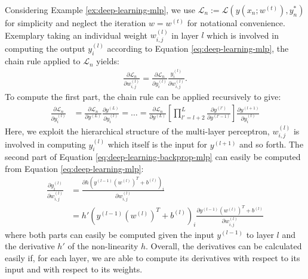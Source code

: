 \begin{example}
  Considering Example \ref{ex:deep-learning-mlp}, we use 
  $\mathcal{L}_n := \mathcal{L}(y(x_n;w^{(t)}), y^*_n)$ for simplicity and
  neglect the iteration $w = w^{(t)}$ for notational convenience. Exemplary taking
  an individual weight $w^{(l)}_{i,j}$ in layer $l$ which is involved in computing
  the output $y_i^{(l)}$ according to Equation \eqref{eq:deep-learning-mlp}, the
  chain rule applied to $\mathcal{L}_n$ yields:
  \begin{align}
    \frac{\partial \mathcal{L}_n}{\partial w^{(l)}_{i,j}}
    = \frac{\partial \mathcal{L}_n}{\partial y_i^{(l)}}\frac{y_i^{(l)}}{\partial w_{i,j}^{(l)}}.
    \label{eq:deep-learning-backprop-mlp}
  \end{align}
  To compute the first part, the chain rule can be applied recursively to give:
  \begin{align}
    \frac{\partial \mathcal{L}_n}{\partial y_i^{(l)}} &= \frac{\partial \mathcal{L}_n}{\partial y^{(L)}} \frac{\partial y^{(L)}}{\partial y_i^{(l)}}
    = \ldots = \frac{\partial \mathcal{L}_n}{\partial y^{(L)}} \left[\prod_{l' = l + 2}^{L} \frac{\partial y^{(l')}}{\partial y^{(l' - 1)}}\right] \frac{\partial y^{(l + 1)}}{\partial y_i^{(l)}}
    \label{eq:deep-learning-backpropr-1}
  \end{align}
  Here, we exploit the hierarchical structure of the multi-layer perceptron, \ie
  $w_{i,j}^{(l)}$ is involved in computing $y_i^{(l)}$ which itself is the input for
  $y^{(l + 1)}$ and so forth. The second part of Equation \eqref{eq:deep-learning-backprop-mlp}
  can easily be computed from Equation \eqref{eq:deep-learning-mlp}:
  \begin{align}
    \frac{\partial y_i^{(l)}}{\partial w_{i,j}^{(l)}}
    &= \frac{\partial h (y^{(l - 1)} (w^{(l)})^T + b^{(l)})_i}{\partial w_{i,j}^{(l)}}\\
    \label{eq:deep-learning-backpropr-2}
    &= h'(y^{(l - 1)} (w^{(l)})^T + b^{(l)})_i \frac{\partial y^{(l - 1)} (w^{(l)})^T + b^{(l)}}{\partial w_{i,j}^{(l)}}
  \end{align}
  where both parts can easily be computed given the input $y^{(l - 1)}$ to layer
  $l$ and the derivative $h'$ of the non-linearity $h$. Overall, the derivatives
  can be calculated easily if, for each layer, we are able to compute its
  derivatives with respect to its input and with respect to its weights.
\end{example}

